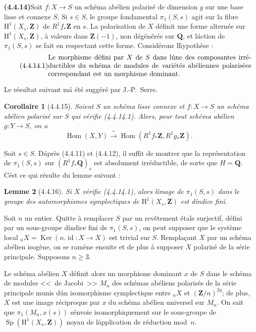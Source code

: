 \documentclass[11pt]{amsart}
\theoremstyle{plain}
\newtheorem{cor}{Corollaire}
\newtheorem{lem}[cor]{Lemme}
\theoremstyle{remark}
\DeclareMathOperator{\Hom}{Hom}
\DeclareMathOperator{\Ker}{Ker}
\DeclareMathOperator{\Sp}{Sp}
\DeclareMathOperator{\id}{id}
\newcommand{\Q}{\mathbf{Q}}
\newcommand{\Z}{\mathbf{Z}}
\newcommand{\HH}{\mathrm{H}}
\begin{document}
\bigskip

\noindent\textbf{(4.4.14)}\quad Soit $f : X \to S$ un sch\'ema ab\'elien polaris\'e de dimension $g$ sur une
base lisse et connexe $S$. Si $s \in S$, le groupe fondamental $\pi_{1}(S,s)$ agit sur la fibre
$\HH^{1}(X_{s}, \Z)$ de $R^{1}f_{*}\Z$ en $s$. La polarisation de $X$ d\'efinit une forme altern\'ee
sur $\HH^{1}(X_{s}, \Z)$, \`a valeurs dans $\Z(-1)$, non d\'eg\'en\'er\'ee sur $\Q$, et l\'action de
$\pi_{1}(S,s)$ se fait en respectant cette forme. Consid\'erons l\'hypoth\`ese :
\begin{equation}\tag{4.4.14.1}
\parbox{0.85\textwidth}{%
Le morphisme d\'efini par $X$ de $S$ dans l\'une des composantes irr\'eductibles du sch\'ema de
modules de vari\'et\'es ab\'eliennes polaris\'ees correspondant est un morphisme dominant.}
\end{equation}

Le r\'esultat suivant m\'a \'et\'e sugg\'er\'e par J.-P.~Serre.

\begin{cor}[4.4.15]
Soient $S$ un sch\'ema lisse connexe et $f : X \to S$ un sch\'ema ab\'elien polaris\'e sur $S$
qui v\'erifie \emph{(4.4.14.1)}. Alors, pour tout sch\'ema ab\'elien $g : Y \to S$, on a
\[
\Hom(X,Y) \xrightarrow{\;\sim\;} \Hom(R^{1}f_{*}\Z, R^{1}g_{*}\Z).
\]
\end{cor}

Soit $s \in S$. D\'apr\`es (4.4.11) et (4.4.12), il suffit de montrer que la repr\'esentation
de $\pi_{1}(S,s)$ sur $(R^{1}f_{*}\Q)_{s}$ est absolument irr\'eductible, de sorte que $H = \Q$.
C\'est ce qui r\'esulte du lemme suivant :

\begin{lem}[4.4.16]
Si $X$ v\'erifie \emph{(4.4.14.1)}, alors l\'image de $\pi_{1}(S,s)$ dans le groupe des
automorphismes symplectiques de $\HH^{1}(X_{s}, \Z)$ est d\'indice fini.
\end{lem}

Soit $n$ un entier. Quitte \`a remplacer $S$ par un rev\^etement \'etale surjectif, d\'efini par
un sous-groupe d\'indice fini de $\pi_{1}(S,s)$, on peut supposer que le syst\`eme local
$_{n}X = \Ker(n.\id : X \to X)$ est trivial sur $S$. Rempla\c{c}ant $X$ par un sch\'ema ab\'elien
isog\`ene, on se ram\`ene ensuite et de plus \`a supposer $X$ polaris\'e de la s\'erie principale.
Supposons $n \geq 3$.

Le sch\'ema ab\'elien $X$ d\'efinit alors un morphisme dominant $x$ de $S$ dans le sch\'ema de
modules <<~de Jacobi~>> $M_{n}$ des sch\'emas ab\'eliens polaris\'es de la s\'erie principale munis
d\'un isomorphisme symplectique entre $_{n}X$ et $(\Z/n)^{2g}$; de plus, $X$ est une image
r\'eciproque par $x$ du sch\'ema ab\'elien universel sur $M_{n}$. On sait que
$\pi_{1}(M_{n}, x(s))$ s\'envoie isomorphiquement sur le sous-groupe de
$\Sp(\HH^{1}(X_{s}, \Z))$ noyau de l\'application de r\'eduction mod~$n$.
\end{document}
